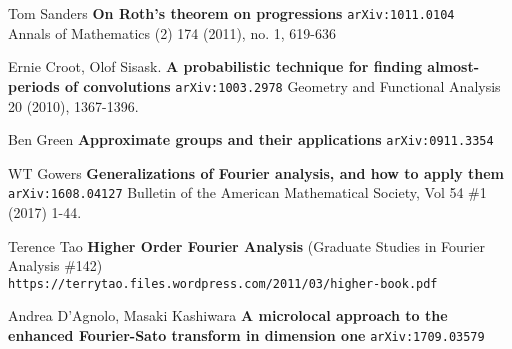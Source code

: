 \documentclass[12pt]{article}
\begin{document}
\begin{thebibliography}{}

\item Tom Sanders \textbf{On Roth's theorem on progressions} \texttt{arXiv:1011.0104} \\
Annals of Mathematics (2) 174 (2011), no. 1, 619-636

\item Ernie Croot, Olof Sisask. \textbf{A probabilistic technique for finding almost-periods of convolutions} \texttt{arXiv:1003.2978} Geometry and Functional Analysis 20 (2010), 1367-1396.

\item Ben Green 
\textbf{Approximate groups and their applications} \texttt{arXiv:0911.3354} 
\item WT Gowers \textbf{Generalizations of Fourier analysis, and how to apply them} \\
\texttt{arXiv:1608.04127} Bulletin of the American Mathematical Society, Vol 54 \#1 (2017) 1-44.
\item Terence Tao \textbf{Higher Order Fourier Analysis} (Graduate Studies in Fourier Analysis \#142) \\
\texttt{https://terrytao.files.wordpress.com/2011/03/higher-book.pdf} \\
\item Andrea D'Agnolo, Masaki Kashiwara \textbf{A microlocal approach to the enhanced Fourier-Sato transform in dimension one} \texttt{arXiv:1709.03579
}

\end{thebibliography}

\newpage
\end{document}
